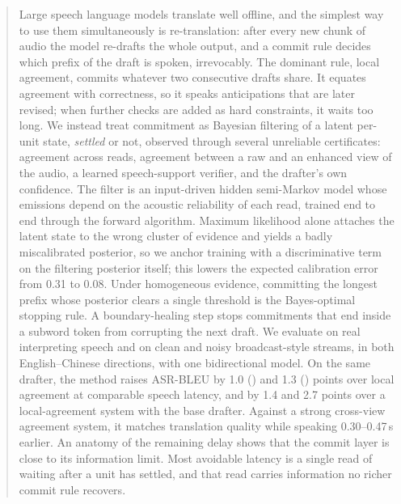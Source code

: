 \begin{abstract}
Large speech language models translate well offline, and the simplest way to use them simultaneously is re-translation: after every new chunk of audio the model re-drafts the whole output, and a commit rule decides which prefix of the draft is spoken, irrevocably.
The dominant rule, local agreement, commits whatever two consecutive drafts share.
It equates agreement with correctness, so it speaks anticipations that are later revised; when further checks are added as hard constraints, it waits too long.
We instead treat commitment as Bayesian filtering of a latent per-unit state, \emph{settled} or not, observed through several unreliable certificates: agreement across reads, agreement between a raw and an enhanced view of the audio, a learned speech-support verifier, and the drafter's own confidence.
The filter is an input-driven hidden semi-Markov model whose emissions depend on the acoustic reliability of each read, trained end to end through the forward algorithm.
Maximum likelihood alone attaches the latent state to the wrong cluster of evidence and yields a badly miscalibrated posterior, so we anchor training with a discriminative term on the filtering posterior itself; this lowers the expected calibration error from 0.31 to 0.08.
Under homogeneous evidence, committing the longest prefix whose posterior clears a single threshold is the Bayes-optimal stopping rule.
A boundary-healing step stops commitments that end inside a subword token from corrupting the next draft.
We evaluate on real interpreting speech and on clean and noisy broadcast-style streams, in both English--Chinese directions, with one bidirectional model.
On the same drafter, the method raises ASR-BLEU by 1.0 (\enzh{}) and 1.3 (\zhen{}) points over local agreement at comparable speech latency, and by 1.4 and 2.7 points over a local-agreement system with the base drafter.
Against a strong cross-view agreement system, it matches translation quality while speaking 0.30--0.47\,s earlier.
An anatomy of the remaining delay shows that the commit layer is close to its information limit.
Most avoidable latency is a single read of waiting after a unit has settled, and that read carries information no richer commit rule recovers.
\end{abstract}
